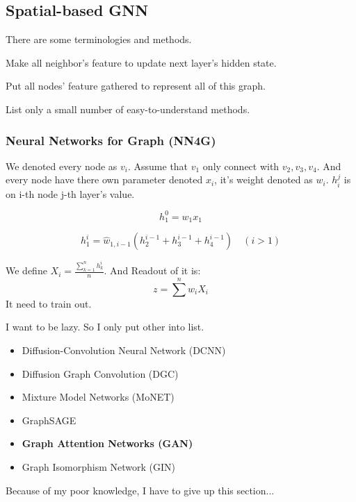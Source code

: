 \documentclass{article}
\newenvironment{colblock}[1][\textbf{Collary}]{\begin{tcolorbox}[colback=JungleGreen!10!Cerulean!15,colframe=CornflowerBlue!60!Black,title = \textbf{#1}]}{\end{tcolorbox}}
\begin{document}
\subsection{Spatial-based GNN}

There are some terminologies and methods. 

\begin{colblock}[Definition of Aggregate]
    Make all neighbor's feature to update next layer's hidden state.
\end{colblock}

\begin{colblock}[Definition of Readout]
    Put all nodes' feature gathered to represent all of this graph.
\end{colblock}

\begin{markerblock}
    List only a small number of easy-to-understand methods.
\end{markerblock}

\subsubsection{Neural Networks for Graph (NN4G)}

We denoted every node as $v_i$. Assume that $v_1$ only connect with $v_2,v_3,v_4$. And every node have there own parameter denoted $x_i$, it's weight denoted as $w_i$. $h_i^j$ is on i-th node j-th layer's value.

$$
h^0_1 = w_1 x_1
$$

$$
h^i_1 = \hat{w}_{1,i-1}(h^{i-1}_{2}+h^{i-1}_{3}+h^{i-1}_{4})\quad (i>1)
$$

We define $X_i = \frac{\sum_{k=1}^n h^i_k}{n}$. And Readout of it is:
$$
z = \sum^n w_iX_i
$$
It need to train out.

I want to be lazy. So I only put other into list.
\begin{itemize}
    \item Diffusion-Convolution Neural Network (DCNN)
    \item Diffusion Graph Convolution (DGC)
    \item Mixture Model Networks (MoNET)
    \item GraphSAGE
    \item \textbf{Graph Attention Networks (GAN)}
    \item Graph Isomorphism Network (GIN)
\end{itemize}

Because of my poor knowledge, I have to give up this section...
\end{document}
